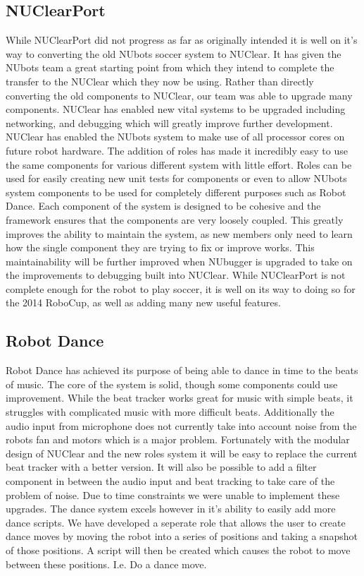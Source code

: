 \documentclass[english,12pt]{scrartcl}
\begin{document}
	\subsection{NUClearPort}
		While NUClearPort did not progress as far as originally intended it is well on it's way to converting the old NUbots soccer system to NUClear.
		It has given the NUbots team a great starting point from which they intend to complete the transfer to the NUClear which they now be using.
		Rather than directly converting the old components to NUClear, our team was able to upgrade many components.
		NUClear has enabled new vital systems to be upgraded including networking, and debugging which will greatly improve further development.
		NUClear has enabled the NUbots system to make use of all processor cores on future robot hardware.
		The addition of roles has made it incredibly easy to use the same components for various different system with little effort.
		Roles can be used for easily creating new unit tests for components or even to allow NUbots system components to be used for completely different purposes such as Robot Dance.
		Each component of the system is designed to be cohesive and the framework ensures that the components are very loosely coupled.
		This greatly improves the ability to maintain the system, as new members only need to learn how the single component they are trying to fix or improve works.
		This maintainability will be further improved when NUbugger is upgraded to take on the improvements to debugging built into NUClear.
		While NUClearPort is not complete enough for the robot to play soccer, it is well on its way to doing so for the 2014 RoboCup, as well as adding many new useful features.
	
	\subsection{Robot Dance}
			Robot Dance has achieved its purpose of being able to dance in time to the beats of music.
			The core of the system is solid, though some components could use improvement.
			While the beat tracker works great for music with simple beats, it struggles with complicated music with more difficult beats.
			Additionally the audio input from microphone does not currently take into account noise from the robots fan and motors which is a major problem.
			Fortunately with the modular design of NUClear and the new roles system it will be easy to replace the current beat tracker with a better version.
			It will also be possible to add a filter component in between the audio input and beat tracking to take care of the problem of noise.
			Due to time constraints we were unable to implement these upgrades.
			The dance system excels however in it's ability to easily add more dance scripts. 
			We have developed a seperate role that allows the user to create dance moves by moving the robot into a series of positions and taking a snapshot of those positions. 
			A script will then be created which causes the robot to move between these positions.
			 I.e. Do a dance move.
\end{document}
